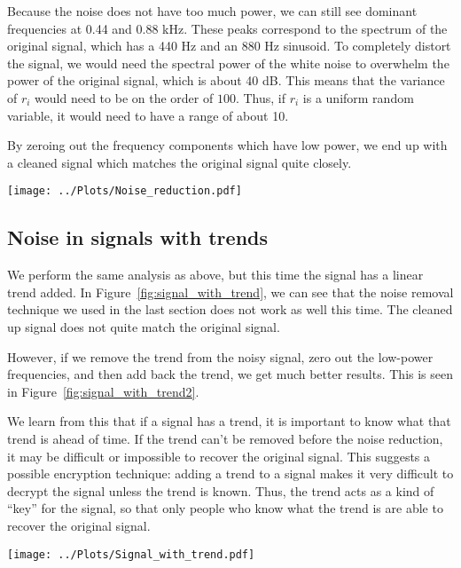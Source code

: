 \documentclass[twocolumn]{myarticle}
\begin{document}
Because the noise does not have too much power, we can still see dominant frequencies at 0.44 and 0.88 kHz.
These peaks correspond to the spectrum of the original signal, which has a 440 Hz and an 880 Hz sinusoid.
To completely distort the signal, we would need the spectral power of the white noise to overwhelm the power of the original signal, which is about 40 dB.
This means that the variance of $ r_i $ would need to be on the order of $ 100 $.
Thus, if $ r_i $ is a uniform random variable, it would need to have a range of about 10.

By zeroing out the frequency components which have low power, we end up with a cleaned signal which matches the original signal quite closely.

\begin{figure*}[htb]
    \centering
    \texttt{[image: ../Plots/Noise\_reduction.pdf]}
    \caption{Use of Fourier transform to remove noise from a signal.}
    \label{fig:noise_reduction}
\end{figure*}

\subsection{Noise in signals with trends}
\label{subsec:noise_in_signals_with_trends}

We perform the same analysis as above, but this time the signal has a linear trend added.
In Figure~\ref{fig:signal_with_trend}, we can see that the noise removal technique we used in the last section does not work as well this time.
The cleaned up signal does not quite match the original signal.

However, if we remove the trend from the noisy signal, zero out the low-power frequencies, and then add back the trend, we get much better results.
This is seen in Figure~\ref{fig:signal_with_trend2}.

We learn from this that if a signal has a trend, it is important to know what that trend is ahead of time.
If the trend can't be removed before the noise reduction, it may be difficult or impossible to recover the original signal.
This suggests a possible encryption technique: adding a trend to a signal makes it very difficult to decrypt the signal unless the trend is known.
Thus, the trend acts as a kind of ``key'' for the signal, so that only people who know what the trend is are able to recover the original signal.

\begin{figure*}[htb]
    \centering
    \texttt{[image: ../Plots/Signal\_with\_trend.pdf]}
    \caption{Noise removed from a signal with a trend.}
    \label{fig:signal_with_trend}
\end{figure*}
\end{document}
